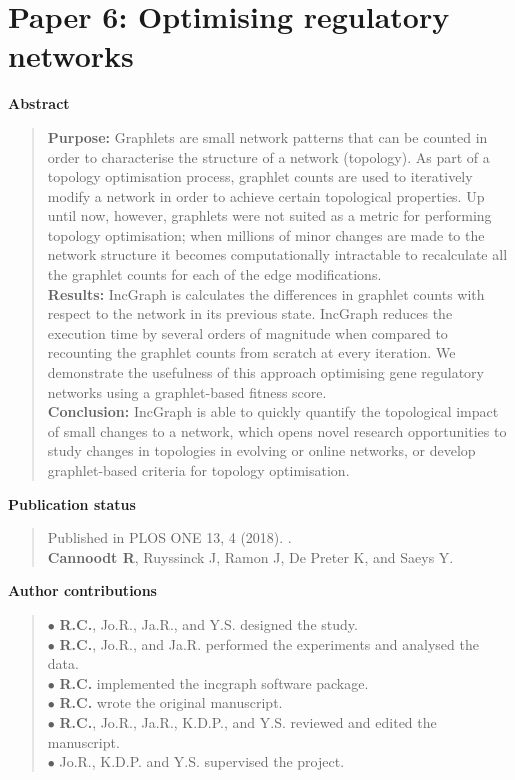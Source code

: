 \documentclass[10pt]{book}
\renewcommand{\chaptermark}[1]{\markboth{#1}{}}
\newif\ifrenderall
\begin{document}
\vfill

\ifrenderall
\newpage
\graphicspath{{./ch6_bred/}}

\fi 
\newpage{\thispagestyle{empty}\cleardoublepage}
\chapter{Paper 6: Optimising regulatory networks} 
\chaptermark{Paper 6: Optimising regulatory networks.} %
\label{chap:incgraph}


{\large \textbf{Abstract}}
\begin{quote}
	\textbf{Purpose:} Graphlets are small network patterns that can be counted in order to characterise the structure of a network (topology). As part of a topology optimisation process, graphlet counts are used to iteratively modify a network in order to achieve certain topological properties.
	Up until now, however, graphlets were not suited as a metric for performing topology optimisation; when millions of minor changes are made to the network structure it becomes computationally intractable to recalculate all the graphlet counts for each of the edge modifications. \\
	\textbf{Results:} IncGraph is calculates the differences in graphlet counts with respect to the network in its previous state.
	IncGraph reduces the execution time by several orders of magnitude when compared to recounting the graphlet counts from scratch at every iteration.
	We demonstrate the usefulness of this approach optimising gene regulatory networks using a graphlet-based fitness score. \\
	\textbf{Conclusion:} IncGraph is able to quickly quantify the topological impact of small changes to a network, which opens novel research opportunities to study changes in topologies in evolving or online networks, or develop graphlet-based criteria for topology optimisation.
\end{quote}

\vfill
{\large \textbf{Publication status}}
\begin{quote}
	Published in PLOS ONE 13, 4 (2018). . \\
	\textbf{Cannoodt R}, Ruyssinck J, Ramon J, De Preter K, and Saeys Y. 
\end{quote}

\vfill
{\large \textbf{Author contributions}}
\begin{quote}
	$\bullet$ \textbf{R.C.}, Jo.R., Ja.R., and Y.S. designed the study.\\
	$\bullet$ \textbf{R.C.}, Jo.R., and Ja.R. performed the experiments and analysed the data.\\
	$\bullet$ \textbf{R.C.} implemented the incgraph software package.\\
	$\bullet$ \textbf{R.C.} wrote the original manuscript.\\
	$\bullet$ \textbf{R.C.}, Jo.R., Ja.R., K.D.P., and Y.S. reviewed and edited the manuscript. \\
	$\bullet$ Jo.R., K.D.P. and Y.S. supervised the project.
\end{quote}
\end{document}
